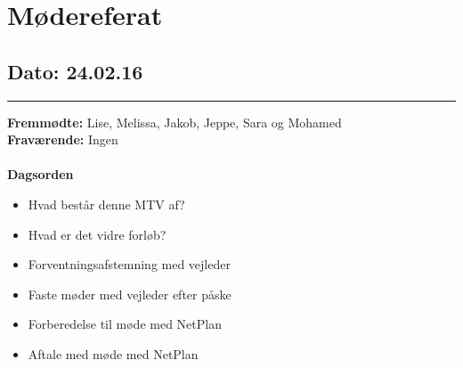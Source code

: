 \chapter{Mødereferat}

\section{Dato: 24.02.16}
\hrule

\textbf{Fremmødte:} Lise, Melissa, Jakob, Jeppe, Sara og Mohamed \\
\textbf{Fraværende:} Ingen
\\
\\
\textbf{Dagsorden}
\begin{itemize}
	\item Hvad består denne MTV af? 
\item Hvad er det vidre forløb? 
\item Forventningsafstemning med vejleder
\item Faste møder med vejleder efter påske
\item Forberedelse til møde med NetPlan 
\item Aftale med møde med NetPlan
\end{itemize}



